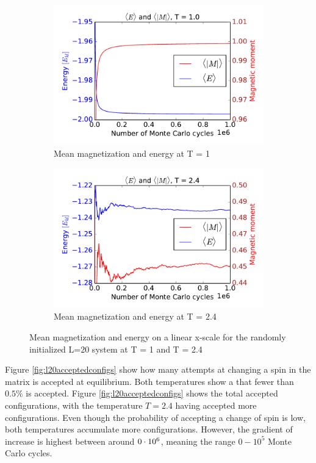 	\begin{figure}[H]
	\begin{subfigure}[b]{0.49\textwidth}
		\includegraphics[width=1\linewidth]{../results/4c/En_mag_T1_0}
		\caption{Mean magnetization and energy at T = 1}
		\label{fig:L20_mag_T_1}
	\end{subfigure}
	\hfill
	\begin{subfigure}[b]{0.49\textwidth}
		\includegraphics[width=1\linewidth]{../results/4c/En_mag_T2_4}
		\caption{Mean magnetization and energy at T = 2.4}
		\label{fig:L20_mag_T_2-4}
	\end{subfigure}
	\caption{Mean magnetization and energy on a linear x-scale for the randomly initialized  L=20 system at T = 1 and T = 2.4}
	\label{fig:her}
\end{figure}


Figure \ref{fig:l20acceptedconfigs} show how many attempts at changing a spin in the matrix is accepted at equilibrium. Both temperatures show a that fewer than $0.5\%  $ is accepted. Figure \ref{fig:l20acceptedconfigs} shows the total accepted configurations, with the temperature $ T =2.4$ having accepted more configurations. Even though the probability of accepting a change of spin is low, both temperatures accumulate more configurations. However, the gradient of increase is highest between around $ 0\cdot 10^{6} $, meaning the range $ 0 -10^{5} $ Monte Carlo cycles.

